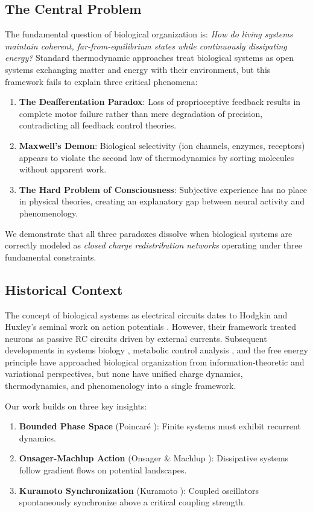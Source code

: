 \documentclass[12pt,a4paper]{article}
\begin{document}
\subsection{The Central Problem}

The fundamental question of biological organization is: \textit{How do living systems maintain coherent, far-from-equilibrium states while continuously dissipating energy?} Standard thermodynamic approaches treat biological systems as open systems exchanging matter and energy with their environment, but this framework fails to explain three critical phenomena:

\begin{enumerate}
\item \textbf{The Deafferentation Paradox}: Loss of proprioceptive feedback results in complete motor failure rather than mere degradation of precision, contradicting all feedback control theories.
\item \textbf{Maxwell's Demon}: Biological selectivity (ion channels, enzymes, receptors) appears to violate the second law of thermodynamics by sorting molecules without apparent work.
\item \textbf{The Hard Problem of Consciousness}: Subjective experience has no place in physical theories, creating an explanatory gap between neural activity and phenomenology.
\end{enumerate}

We demonstrate that all three paradoxes dissolve when biological systems are correctly modeled as \textit{closed charge redistribution networks} operating under three fundamental constraints.

\subsection{Historical Context}

The concept of biological systems as electrical circuits dates to Hodgkin and Huxley's seminal work on action potentials \cite{hodgkin1952quantitative}. However, their framework treated neurons as passive RC circuits driven by external currents. Subsequent developments in systems biology \cite{kitano2002systems}, metabolic control analysis \cite{fell1992metabolic}, and the free energy principle \cite{friston2010free} have approached biological organization from information-theoretic and variational perspectives, but none have unified charge dynamics, thermodynamics, and phenomenology into a single framework.

Our work builds on three key insights:
\begin{enumerate}
\item \textbf{Bounded Phase Space} (Poincaré \cite{poincare1890probleme}): Finite systems must exhibit recurrent dynamics.
\item \textbf{Onsager-Machlup Action} (Onsager \& Machlup \cite{onsager1953fluctuations}): Dissipative systems follow gradient flows on potential landscapes.
\item \textbf{Kuramoto Synchronization} (Kuramoto \cite{kuramoto1975self}): Coupled oscillators spontaneously synchronize above a critical coupling strength.
\end{enumerate}
\end{document}
